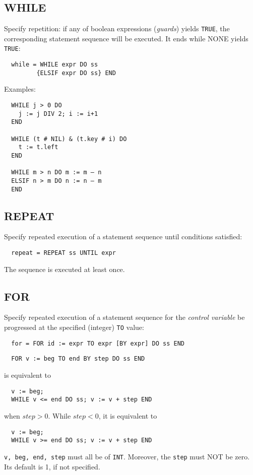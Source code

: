\subsection{WHILE}
Specify repetition: if any of boolean expressions (\emph{guards}) yields \verb|TRUE|, the
corresponding statement sequence will be executed. It ends while NONE yields \verb|TRUE|:
\begin{verbatim}
  while = WHILE expr DO ss
         {ELSIF expr DO ss} END
\end{verbatim}
Examples:
\begin{verbatim}
  WHILE j > 0 DO
    j := j DIV 2; i := i+1
  END
 
  WHILE (t # NIL) & (t.key # i) DO
    t := t.left
  END
 
  WHILE m > n DO m := m – n
  ELSIF n > m DO n := n – m
  END
\end{verbatim}

\subsection{REPEAT}
Specify repeated execution of a statement sequence until conditions satisfied:
\begin{verbatim}
  repeat = REPEAT ss UNTIL expr
\end{verbatim}
The sequence is executed at least once.

\subsection{FOR}
Specify repeated execution of a statement sequence for the \emph{control variable} be
progressed at the specified (integer) \verb|TO| value:
\begin{verbatim}
  for = FOR id := expr TO expr [BY expr] DO ss END
\end{verbatim}
\begin{verbatim}
  FOR v := beg TO end BY step DO ss END
\end{verbatim}
is equivalent to
\begin{verbatim}
  v := beg;
  WHILE v <= end DO ss; v := v + step END
\end{verbatim}
when $step > 0$. While $step < 0$, it is equivalent to
\begin{verbatim}
  v := beg;
  WHILE v >= end DO ss; v := v + step END
\end{verbatim}
\verb|v, beg, end, step| must all be of \verb|INT|. Moreover, the \verb|step| must NOT be
zero. Its default is 1, if not specified.

